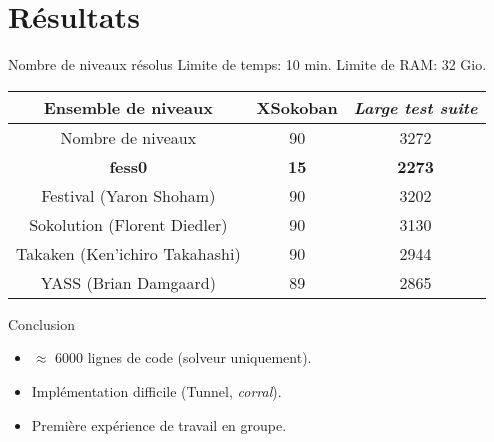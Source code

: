    \section{Résultats}
        \begin{frame}{Nombre de niveaux résolus}
            \centering
            Limite de temps: 10 min. Limite de RAM: 32 Gio.

            \vspace{0.42cm}
            \begin{tabular}{|c|c|c|}
                \hline
                Ensemble de niveaux            & XSokoban    & \textit{Large test suite} \\
                \hline
                Nombre de niveaux              & 90          & 3272 \\
                \hline
                \textbf{fess0}                 & \textbf{15} & \textbf{2273} \\
                \hline
                Festival (Yaron Shoham)        & 90          & 3202 \\
                \hline
                Sokolution (Florent Diedler)   & 90          & 3130 \\
                \hline
                Takaken (Ken'ichiro Takahashi) & 90          & 2944 \\
                \hline
                YASS (Brian Damgaard)          & 89          & 2865 \\
                \hline
            \end{tabular}

        \end{frame}

        \begin{frame}{Conclusion}
            \begin{itemize}
                \item $\approx$ 6000 lignes de code (solveur uniquement).
                \item Implémentation difficile (Tunnel, \textit{corral}).
                \item Première expérience de travail en groupe.
            \end{itemize}
        \end{frame}

